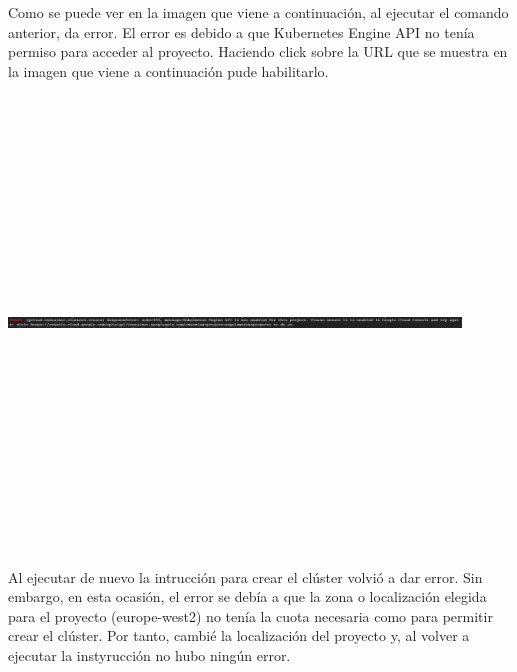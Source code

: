 \documentclass[english,runningheads,a4paper]{llncs}[2018/03/10]
\newenvironment{nscenter}
 {\parskip=0pt\par\nopagebreak\centering}
 {\par\noindent\ignorespacesafterend}
\begin{document}
Como se puede ver en la imagen que viene a continuación, al ejecutar el comando 
anterior, da error. El error es debido a que Kubernetes Engine API no tenía 
permiso para acceder al proyecto. Haciendo click sobre la URL que se muestra en 
la imagen que viene a continuación pude habilitarlo.
\newline
\begin{nscenter}
\includegraphics[width=12cm,height=12cm,keepaspectratio]{./Contenedores/Googlecloud/44.png}
\end{nscenter}
\newline
Al ejecutar de nuevo la intrucción para crear el clúster volvió a dar error. Sin
embargo, en esta ocasión, el error se debía a que la zona o localización elegida
para el proyecto (europe-west2) no tenía la cuota necesaria como para permitir 
crear el clúster. Por tanto, cambié la localización del proyecto y, al volver a 
ejecutar la instyrucción no hubo ningún error.
\newline
\end{document}
